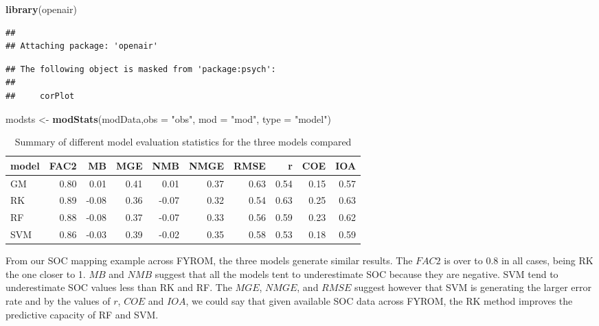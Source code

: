 \documentclass[10pt,b5paper,]{book}
\newenvironment{Shaded}{\begin{snugshade}}{\end{snugshade}}
\newcommand{\DataTypeTok}[1]{\textcolor[rgb]{0.13,0.29,0.53}{#1}}
\newcommand{\KeywordTok}[1]{\textcolor[rgb]{0.13,0.29,0.53}{\textbf{#1}}}
\newcommand{\NormalTok}[1]{#1}
\newcommand{\StringTok}[1]{\textcolor[rgb]{0.31,0.60,0.02}{#1}}
\theoremstyle{definition}
\theoremstyle{definition}
\theoremstyle{definition}
\theoremstyle{remark}
\begin{document}
\begin{Shaded}
\begin{Highlighting}[]
\KeywordTok{library}\NormalTok{(openair)}
\end{Highlighting}
\end{Shaded}

\begin{verbatim}
## 
## Attaching package: 'openair'
\end{verbatim}

\begin{verbatim}
## The following object is masked from 'package:psych':
## 
##     corPlot
\end{verbatim}

\begin{Shaded}
\begin{Highlighting}[]
\NormalTok{modsts <-}\StringTok{ }\KeywordTok{modStats}\NormalTok{(modData,}\DataTypeTok{obs =} \StringTok{"obs"}\NormalTok{, }\DataTypeTok{mod =} \StringTok{"mod"}\NormalTok{, }\DataTypeTok{type =} \StringTok{"model"}\NormalTok{)}
\end{Highlighting}
\end{Shaded}

\begin{table}

\caption{\label{tab:modsts}Summary of different model evaluation statistics for the three models compared}
\centering
\begin{tabular}[t]{lrrrrrrrrr}
\toprule
model & FAC2 & MB & MGE & NMB & NMGE & RMSE & r & COE & IOA\\
\midrule
GM & 0.80 & 0.01 & 0.41 & 0.01 & 0.37 & 0.63 & 0.54 & 0.15 & 0.57\\
RK & 0.89 & -0.08 & 0.36 & -0.07 & 0.32 & 0.54 & 0.63 & 0.25 & 0.63\\
RF & 0.88 & -0.08 & 0.37 & -0.07 & 0.33 & 0.56 & 0.59 & 0.23 & 0.62\\
SVM & 0.86 & -0.03 & 0.39 & -0.02 & 0.35 & 0.58 & 0.53 & 0.18 & 0.59\\
\bottomrule
\end{tabular}
\end{table}

From our SOC mapping example across FYROM, the three models generate
similar results. The \(FAC2\) is over to 0.8 in all cases, being RK the
one closer to 1. \(MB\) and \(NMB\) suggest that all the models tent to
underestimate SOC because they are negative. SVM tend to underestimate
SOC values less than RK and RF. The \(MGE\), \(NMGE\), and \(RMSE\)
suggest however that SVM is generating the larger error rate and by the
values of \(r\), \(COE\) and \(IOA\), we could say that given available
SOC data across FYROM, the RK method improves the predictive capacity of
RF and SVM.
\end{document}
